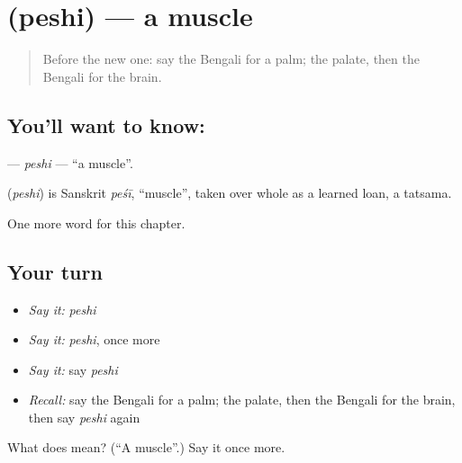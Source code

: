 \section[\texorpdfstring{\bn{পেশি} (peshi)}{পেশি (peshi)}]{ (peshi) — a muscle}

\label{lesson:BN-C186-peshi}



\begin{quote}
Before the new one: say the Bengali for a palm; the palate, then the Bengali for the brain.
\end{quote}

\subsection*{You'll want to know: }
\textbf{} — \emph{peshi} — \textquotedblleft{}a muscle\textquotedblright{}.

\begin{cousinweb}
\textbf{} (\emph{peshi}) is Sanskrit \emph{peśī}, \textquotedblleft{}muscle\textquotedblright{}, taken over whole as a learned loan, a tatsama.
\end{cousinweb}

\begin{grammarlens}[title={What you've built}]
One more word for this chapter.
\end{grammarlens}

\subsection*{Your turn}
\begin{itemize}
\raggedright
  \item \emph{Say it:} \emph{peshi}
  \item \emph{Say it:} \emph{peshi}, once more
  \item \emph{Say it:} say \emph{peshi}
  \item \emph{Recall:} say the Bengali for a palm; the palate, then the Bengali for the brain, then say \emph{peshi} again
\end{itemize}

\begin{tcolorbox}[breakable,colback=teal!4,colframe=teal!35!black,title={Before you move on}]
What does  mean? (\textquotedblleft{}A muscle\textquotedblright{}.) Say it once more.
\end{tcolorbox}
